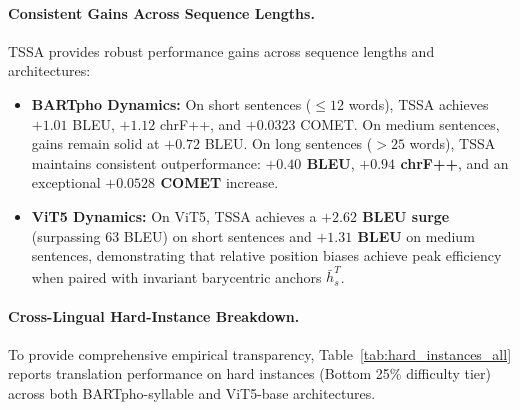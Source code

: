\documentclass[11pt]{article}
\begin{document}
\paragraph{Consistent Gains Across Sequence Lengths.}
TSSA provides robust performance gains across sequence lengths and architectures:
\begin{itemize}[leftmargin=*]
    \item \textbf{BARTpho Dynamics:} On short sentences ($\le 12$ words), TSSA achieves $+1.01$ BLEU, $+1.12$ chrF++, and $+0.0323$ COMET. On medium sentences, gains remain solid at $+0.72$ BLEU. On long sentences ($> 25$ words), TSSA maintains consistent outperformance: \textbf{$+0.40$ BLEU}, \textbf{$+0.94$ chrF++}, and an exceptional \textbf{$+0.0528$ COMET} increase.
    \item \textbf{ViT5 Dynamics:} On ViT5, TSSA achieves a \textbf{$+2.62$ BLEU surge} (surpassing 63 BLEU) on short sentences and \textbf{$+1.31$ BLEU} on medium sentences, demonstrating that relative position biases achieve peak efficiency when paired with invariant barycentric anchors $\bar{h}_s^T$.
\end{itemize}

\paragraph{Cross-Lingual Hard-Instance Breakdown.}\label{sec:hard_instances}
To provide comprehensive empirical transparency, Table~\ref{tab:hard_instances_all} reports translation performance on hard instances (Bottom 25\% difficulty tier) across both BARTpho-syllable and ViT5-base architectures.
\end{document}
